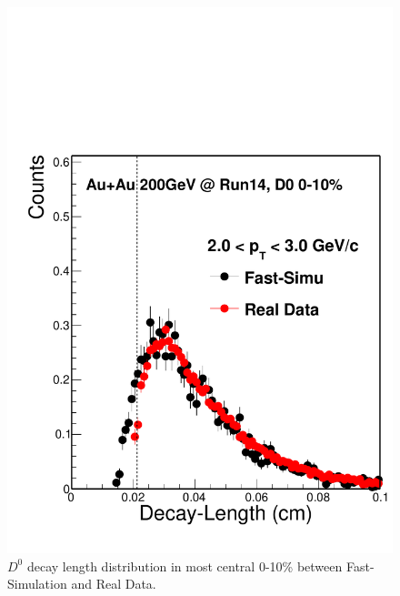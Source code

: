 \documentclass[a4paper]{article}
\begin{document}
\begin{figure}[htbp]
\begin{minipage}[htbp]{0.52\linewidth}
\includegraphics[width=1.0\textwidth,angle=0]{fig/DecayL.pdf} 
\caption{ $D^0$ decay length distribution in most central 0-10\% between Fast-Simulation and Real Data.\label{DecayL}}
\end{minipage}
\end{figure}
\end{document}

